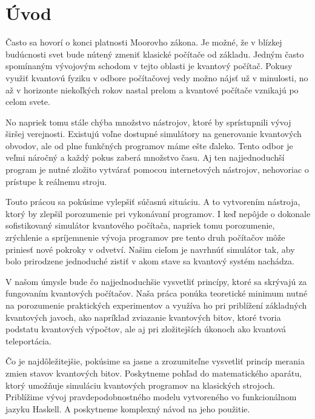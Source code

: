 

\chapter*{Úvod}

Často sa hovorí o konci platnosti Moorovho zákona. Je možné, že v blízkej
budúcnosti svet bude nútený zmeniť klasické počítače od základu. Jedným 
často spomínaným vývojovým schodom v tejto oblasti je kvantový počítač.
Pokusy využiť kvantovú fyziku v odbore počítačovej vedy možno nájsť už v
minulosti, no až v horizonte niekoľkých rokov nastal prelom a kvantové
počítače vznikajú po celom svete.

No napriek tomu stále chýba množstvo nástrojov, ktoré by sprístupnili vývoj
širšej verejnosti. Existujú voľne dostupné simulátory na generovanie kvantových
obvodov, ale od plne funkčných programov máme ešte ďaleko. Tento odbor je 
veľmi náročný a každý pokus zaberá množstvo času. Aj ten najjednoduchší program
je nutné zložito vytvárať pomocou internetových nástrojov, nehovoriac o 
prístupe k reálnemu stroju.

Touto prácou sa pokúsime vylepšiť súčasnú situáciu. A to vytvorením nástroja,
ktorý by zlepšil porozumenie pri vykonávaní programov. I keď nepôjde o 
dokonale sofistikovaný simulátor kvantového počítača, napriek tomu porozumenie,
zrýchlenie a spríjemnenie vývoja programov pre tento druh počítačov môže 
priniesť nové pokroky v odvetví. Našim cieľom je navrhnúť simulátor tak, aby 
bolo prirodzene jednoduché zistiť v akom stave sa kvantový systém nachádza.

V našom úmysle bude čo najjednoduchšie vysvetliť princípy, ktoré sa skrývajú
za fungovaním kvantových počítačov. Naša práca ponúka teoretické minimum
nutné na porozumenie praktických experimentov a využíva ho pri priblížení
základných kvantových javoch, ako napríklad zviazanie kvantových bitov, ktoré 
tvoria podstatu kvantových výpočtov, ale aj pri zložitejších úkonoch ako 
kvantová teleportácia.


Čo je najdôležitejšie, pokúsime sa jasne a zrozumiteľne vysvetliť princíp
merania zmien stavov kvantových bitov. Poskytneme pohľad do matematického
aparátu, ktorý umožňuje simuláciu kvantových programov na klasických strojoch.
Priblížime vývoj pravdepodobnostného modelu vytvoreného vo funkcionálnom jazyku
Haskell. A poskytneme komplexný návod na jeho použitie.
